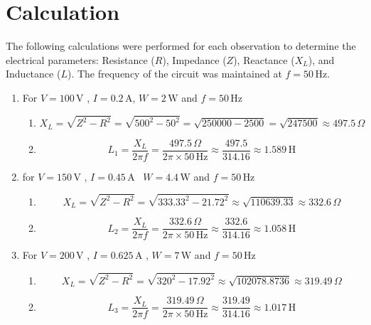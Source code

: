 \documentclass[a4paper,12pt]{article}
\begin{document}
	\section{Calculation}
	
	The following calculations were performed for each observation to determine the electrical parameters: Resistance (\( R \)), Impedance (\( Z \)), Reactance (\( X_L \)), and Inductance (\( L \)). The frequency of the circuit was maintained at \( f = 50\,\text{Hz} \).
	
	\begin{enumerate}
		\item 
		For  \( V = 100\,\text{V} \) , \( I = 0.2\,\text{A} \),   \( W = 2\,\text{W} \) and   \( f = 50\,\text{Hz} \)
		
		
		
		\begin{enumerate}
			
			\item 
			\[
			X_L = \sqrt{Z^{2} - R^{2}} = \sqrt{500^{2} - 50^{2}} = \sqrt{250000 - 2500} = \sqrt{247500} \approx 497.5\,\Omega
			\]
			\item
			\[
			L_1 = \frac{X_L}{2\pi f} = \frac{497.5\,\Omega}{2\pi \times 50\,\text{Hz}} \approx \frac{497.5}{314.16} \approx 1.589\,\text{H}
			\]
			
			
		\end{enumerate}
		
		\item 	
		
		for \( V = 150\,\text{V} \)
		, \( I = 0.45\,\text{A} \)
		\, \( W = 4.4\,\text{W} \)
		and \( f = 50\,\text{Hz} \)
		
		
		\begin{enumerate}
			
			\item 
			\[
			X_L = \sqrt{Z^{2} - R^{2}} = \sqrt{333.33^{2} - 21.72^{2}} \approx \sqrt{110639.33} \approx 332.6\,\Omega
			\]
			\item
			\[
			L_2 = \frac{X_L}{2\pi f} = \frac{332.6\,\Omega}{2\pi \times 50\,\text{Hz}} \approx \frac{332.6}{314.16} \approx 1.058\,\text{H}
			\]
			
		\end{enumerate}
		
		
		\item 
		
		
		For	\( V = 200\,\text{V} \)
		, \( I = 0.625\,\text{A} \)
		, \( W = 7\,\text{W} \)
		and \( f = 50\,\text{Hz} \)
		
		\begin{enumerate}
			
			\item 
			\[
			X_L = \sqrt{Z^{2} - R^{2}} = \sqrt{320^{2} - 17.92^{2}}  \approx \sqrt{102078.8736} \approx 319.49\,\Omega
			\]
			\item
			\[
			L_3 = \frac{X_L}{2\pi f} = \frac{319.49\,\Omega}{2\pi \times 50\,\text{Hz}} \approx \frac{319.49}{314.16} \approx 1.017\,\text{H}
			\]
			
			
		\end{enumerate}
		
	\end{enumerate}
\end{document}
